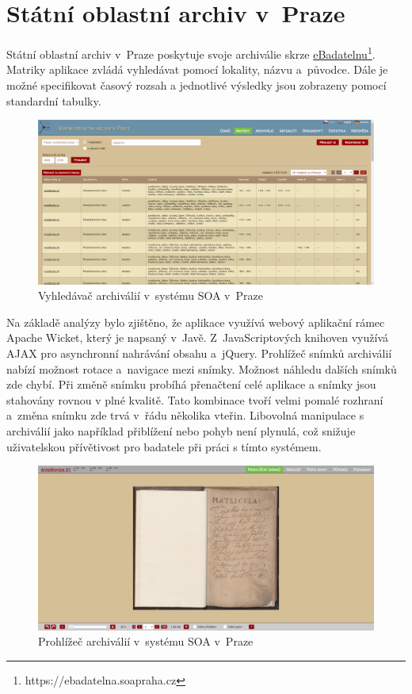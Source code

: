 \newpage
\section{Státní oblastní archiv v~Praze}
Státní oblastní archiv v~Praze poskytuje svoje archiválie skrze \href{https://ebadatelna.soapraha.cz}{eBadatelnu}\footnote{https://ebadatelna.soapraha.cz}. Matriky aplikace zvládá vyhledávat pomocí lokality, názvu a~původce. Dále je možné specifikovat časový rozsah a jednotlivé výsledky jsou zobrazeny pomocí standardní tabulky.

\begin{figure}[htbp]
\centering
    \includegraphics[scale=.2]{obrazky-figures/archives/soaPraha/vyhledani.png}
    \caption{Vyhledávač archiválií v~systému SOA v~Praze}
\end{figure}

\newpage
\noindent
Na základě analýzy bylo zjištěno, že aplikace využívá webový aplikační rámec Apache Wicket, který je napsaný v~Javě. Z~JavaScriptových knihoven využívá AJAX pro asynchronní nahrávání obsahu a~jQuery.
\newpara
Prohlížeč snímků archiválií nabízí možnost rotace a~navigace mezi snímky. Možnost náhledu dalších snímků zde chybí. Při změně snímku probíhá přenačtení celé aplikace a snímky jsou stahovány rovnou v plné kvalitě. Tato kombinace tvoří velmi pomalé rozhraní a~změna snímku zde trvá v~řádu několika vteřin. Libovolná manipulace s archiválií jako například přiblížení nebo pohyb není plynulá, což snižuje uživatelskou přívětivost pro badatele při práci s tímto systémem.

\begin{figure}[htbp]
\centering
    \includegraphics[scale=.2]{obrazky-figures/archives/soaPraha/prohlizec.png}
    \caption{Prohlížeč archiválií v~systému SOA v~Praze}
\end{figure}

